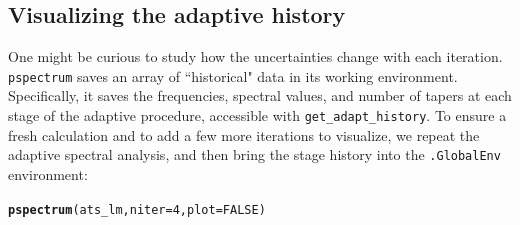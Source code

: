 \documentclass[10pt]{article}\usepackage[]{graphicx}\usepackage[]{color}
\makeatletter
\newcommand{\hlnum}[1]{\textcolor[rgb]{0.686,0.059,0.569}{#1}}%
\newcommand{\hlstd}[1]{\textcolor[rgb]{0.345,0.345,0.345}{#1}}%
\newcommand{\hlkwc}[1]{\textcolor[rgb]{0.333,0.667,0.333}{#1}}%
\newcommand{\hlkwd}[1]{\textcolor[rgb]{0.737,0.353,0.396}{\textbf{#1}}}%
\newenvironment{kframe}{%
 \def\at@end@of@kframe{}%
 \ifinner\ifhmode%
  \def\at@end@of@kframe{\end{minipage}}%
  \begin{minipage}{\columnwidth}%
 \fi\fi%
 \def\FrameCommand##1{\hskip\@totalleftmargin \hskip-\fboxsep
 \colorbox{shadecolor}{##1}\hskip-\fboxsep
     \hskip-\linewidth \hskip-\@totalleftmargin \hskip\columnwidth}%
 \MakeFramed {\advance\hsize-\width
   \@totalleftmargin\z@ \linewidth\hsize
   \@setminipage}}%
 {\par\unskip\endMakeFramed%
 \at@end@of@kframe}
\newenvironment{knitrout}{}{} %
\newcommand{\Rcmd}[1]{\texttt{#1}}
\makeatother
\begin{document}
\subsection{Visualizing the adaptive history}
One might be curious to study how the
uncertainties change with each iteration.
\Rcmd{pspectrum}
 saves an array of ``historical" data in its working environment.
 Specifically, it saves the frequencies,
 spectral values, and number of tapers at each stage of the adaptive
 procedure, accessible with \Rcmd{get\_adapt\_history}.
 To ensure a fresh calculation and to 
 add a few more iterations to visualize, 
we repeat the adaptive spectral analysis, 
and then bring the stage history into the \Rcmd{.GlobalEnv} environment:
\begin{knitrout}
\color{fgcolor}\begin{kframe}
\begin{alltt}
\hlkwd{pspectrum}\hlstd{(ats_lm,} \hlkwc{niter}\hlstd{=}\hlnum{4}\hlstd{,} \hlkwc{plot}\hlstd{=}\hlnum{FALSE}\hlstd{)}
\end{alltt}



\end{kframe}
\end{knitrout}
\end{document}
